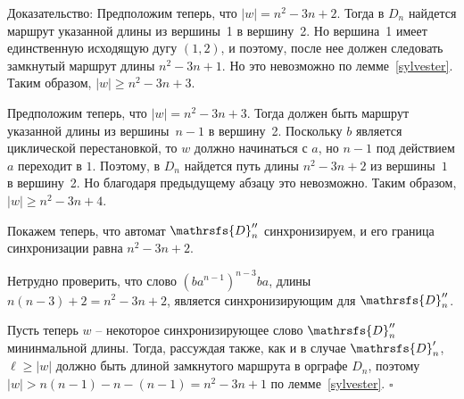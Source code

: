 \documentclass[11pt]{article}
\newcommand{\sw}{reset word}
\newenvironment{proof}{Доказательство:}{$\square$}
\begin{document}
\begin{proof}
Предположим теперь, что $|w|=n^2-3n+2$. Тогда в $D_n$ найдется маршрут указанной длины из 
вершины~1 в вершину~2. Но вершина~1 имеет единственную исходящую дугу $(1,2)$, и поэтому,
после нее должен следовать замкнутый маршрут длины $n^2-3n+1$. Но это невозможно по 
лемме~\ref{sylvester}. Таким образом, $|w|\ge n^2-3n+3$.


Предположим теперь, что $|w|=n^2-3n+3$. Тогда должен быть маршрут указанной длины из вершины~$n-1$
в вершину~2. Поскольку $b$ является циклической перестановкой, то $w$ должно начинаться с $a$, 
но $n - 1$ под действием $a$ переходит в $1$. Поэтому, в $D_n$ найдется 
путь длины $n^2-3n+2$ из вершины~$1$ в вершину~2.
Но благодаря предыдущему абзацу это невозможно. Таким образом, $|w|\ge n^2-3n+4$.



\medskip

Покажем теперь, что автомат $\mathrsfs{D}''_n$ синхронизируем, и его граница синхронизации
равна $n^2-3n+2$.

Нетрудно проверить, что слово $(ba^{n - 1})^{n - 3}ba$, длины $n(n - 3) + 2 = n^2 -3n + 2$,
является синхронизирующим для $\mathrsfs{D}''_n$.

Пусть теперь $w$ -- некоторое синхронизирующее слово $\mathrsfs{D}''_n$ мининмальной длины. 
Тогда, рассуждая также, как и в случае $\mathrsfs{D}'_n$,
$\ell\ge|w|$ должно быть длиной замкнутого маршрута в орграфе $D_n$, поэтому
$|w|>n(n-1)-n-(n-1)=n^2-3n+1$ по лемме~\ref{sylvester}.
%
%
\end{proof}
\end{document}
